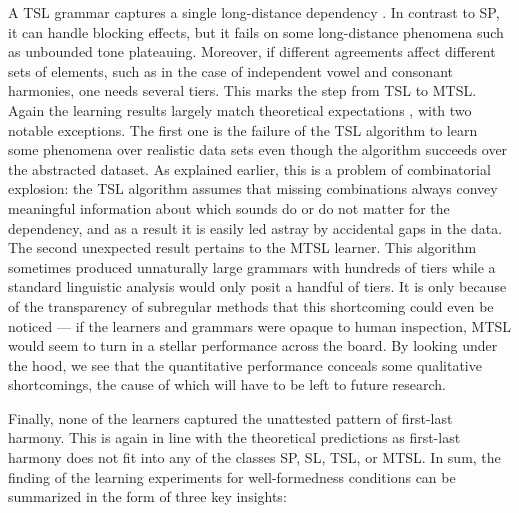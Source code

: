 A TSL grammar captures a single long-distance dependency \citep{HeinzRawal11,JardineMcMullin2017}.
In contrast to SP, it can handle blocking effects, but it fails on some long-distance phenomena such as unbounded tone plateauing.
Moreover, if different agreements affect different sets of elements, such as in the case of independent vowel and consonant harmonies, one needs several tiers.
This marks the step from TSL to MTSL.
Again the learning results largely match theoretical expectations \citep{DeSantoGraf19FG,McMullinAksenovaDeSanto2019}, with two notable exceptions.
The first one is the failure of the TSL algorithm to learn some phenomena over realistic data sets even though the algorithm succeeds over the abstracted dataset.
As explained earlier, this is a problem of combinatorial explosion: the TSL algorithm assumes that missing combinations always convey meaningful information about which sounds do or do not matter for the dependency, and as a result it is easily led astray by accidental gaps in the data.
The second unexpected result pertains to the MTSL learner.
This algorithm sometimes produced unnaturally large grammars with hundreds of tiers while a standard linguistic analysis would only posit a handful of tiers.
It is only because of the transparency of subregular methods that this shortcoming could even be noticed --- if the learners and grammars were opaque to human inspection, MTSL would seem to turn in a stellar performance across the board.
By looking under the hood, we see that the quantitative performance conceals some qualitative shortcomings, the cause of which will have to be left to future research.

Finally, none of the learners captured the unattested pattern of first-last harmony.
This is again in line with the theoretical predictions as first-last harmony does not fit into any of the classes SP, SL, TSL, or MTSL\@.
In sum, the finding of the learning experiments for well-formedness conditions can be summarized in the form of three key insights:


